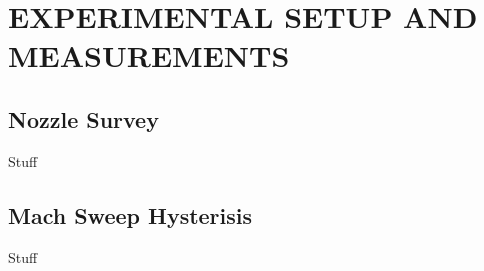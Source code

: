 %
%  
%

\chapter{EXPERIMENTAL SETUP AND MEASUREMENTS}

\section{Nozzle Survey}

Stuff

\section{Mach Sweep Hysterisis}

Stuff
